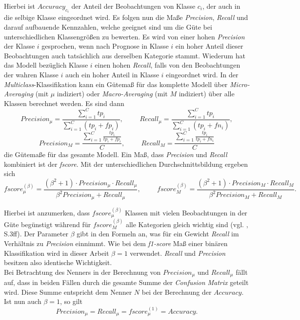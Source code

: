 \documentclass[a4paper,11pt]{article}
\begin{document}
Hierbei ist $Accuracy_{c_i}$ der Anteil der Beobachtungen von Klasse $c_i$, der auch in die selbige Klasse eingeordnet wird. Es folgen nun die Maße \textit{Precision}, \textit{Recall} und darauf aufbauende Kennzahlen, welche geeignet sind um die Güte bei unterschiedlichen Klassengrößen zu bewerten. Es wird von einer hohen \textit{Precision} der Klasse $i$ gesprochen, wenn nach Prognose in Klasse $i$ ein hoher Anteil dieser Beobachtungen auch tatsächlich aus derselben Kategorie stammt. Wiederum hat das Modell bezüglich Klasse $i$ einen hohen \textit{Recall}, falls von den Beobachtungen der wahren Klasse $i$ auch ein hoher Anteil in Klasse $i$ eingeordnet wird.
In der \textit{Multiclass}-Klassifikation kann ein Gütemaß für das komplette Modell über \textit{Micro-Averaging} (mit $\mu$ indiziert) oder \textit{Macro-Averaging} (mit $M$ indiziert) über alle Klassen berechnet werden. Es sind dann 
\[ Precision_{\mu} = \frac{\sum_{i = 1}^C tp_i}{\sum_{i = 1}^C (tp_i + fp_i)}, \hspace{1cm} Recall_{\mu} = \frac{\sum_{i = 1}^C tp_i}{\sum_{i = 1}^C (tp_i + fn_i)},\]
\[ Precision_M = \frac{\sum_{i = 1}^C \frac{tp_i}{tp_i + fp_i} }{C}, \hspace{1cm} Recall_M = \frac{\sum_{i = 1}^C \frac{tp_i}{tp_i + fn_i} }{C}\]
die Gütemaße für das gesamte Modell. Ein Maß, dass \textit{Precision} und \textit{Recall} kombiniert ist der \textit{fscore}. Mit der unterschiedlichen Durchschnittsbildung ergeben sich
\[ fscore_{\mu}^{(\beta)} = \frac{(\beta^2+1) \cdot Precision_{\mu} \cdot Recall_{\mu}}{\beta^2 Precision_{\mu}+ Recall_{\mu}}, \hspace{1cm} fscore_{M}^{(\beta)} = \frac{(\beta^2+1) \cdot Precision_{M} \cdot Recall_{M}}{\beta^2 Precision_{M}+ Recall_{M}} . \]

Hierbei ist anzumerken, dass $fscore_{\mu}^{(\beta)}$ Klassen mit vielen Beobachtungen in der Güte begünstigt während für $fscore_M^{(\beta)}$ alle Kategorien gleich wichtig sind  (vgl. \cite{sokolova}, S.3ff). Der Parameter $\beta$ gibt in den Formeln an, was für ein Gewicht \textit{Recall} im Verhältnis zu \textit{Precision} einnimmt.
Wie bei dem \textit{f1-score} Maß einer binären Klassifikation wird in dieser Arbeit $\beta = 1$ verwendet. \textit{Recall} und \textit{Precision} besitzen also identische Wichtigkeit. \\
Bei Betrachtung des Nenners in der Berechnung von $Precision_{\mu}$ und $Recall_{\mu}$ fällt auf, dass in beiden Fällen durch die gesamte Summe der \textit{Confusion Matrix} geteilt wird. Diese Summe entspricht dem Nenner $N$ bei der Berechnung der $Accuracy$. Ist nun auch $\beta = 1$, so gilt 
\[Precision_{\mu} =  Recall_{\mu} =  fscore_{\mu}^{(1)} = Accuracy.\]
\end{document}
